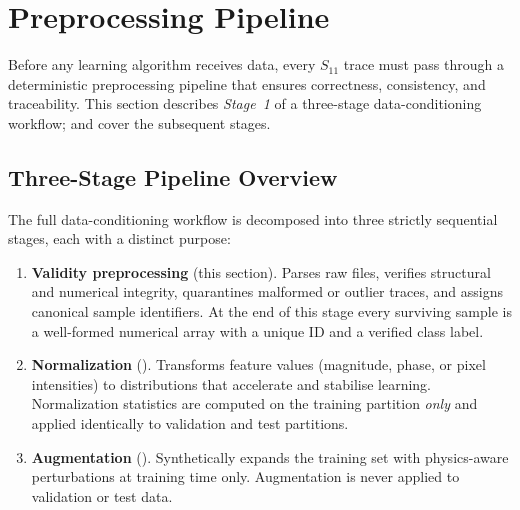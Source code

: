 
\section{Preprocessing Pipeline}
\label{sec:preproc}

Before any learning algorithm receives data, every $S_{11}$ trace must pass
through a deterministic preprocessing pipeline that ensures correctness,
consistency, and traceability.  This section describes \emph{Stage~1} of a
three-stage data-conditioning workflow;  and
 cover the subsequent stages.

\subsection{Three-Stage Pipeline Overview}
\label{sec:preproc:stages}

The full data-conditioning workflow is decomposed into three strictly
sequential stages, each with a distinct purpose:

\begin{enumerate}[label=\textbf{Stage~\arabic*:},leftmargin=3.5em]
  \item \textbf{Validity preprocessing} (this section).
        Parses raw files, verifies structural and numerical integrity,
        quarantines malformed or outlier traces, and assigns canonical
        sample identifiers.  At the end of this stage every surviving
        sample is a well-formed numerical array with a unique ID and a
        verified class label.

  \item \textbf{Normalization} ().
        Transforms feature values (magnitude, phase, or pixel
        intensities) to distributions that accelerate and stabilise
        learning.  Normalization statistics are computed on the training
        partition \emph{only} and applied identically to validation and
        test partitions.

  \item \textbf{Augmentation} ().
        Synthetically expands the training set with physics-aware
        perturbations at training time only.  Augmentation is never
        applied to validation or test data.
\end{enumerate}

